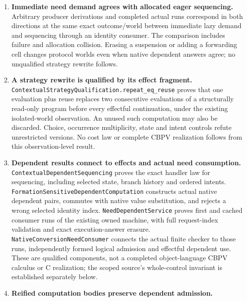 \documentclass[11pt]{article}
\theoremstyle{definition}
\theoremstyle{remark}
\begin{document}
\begin{enumerate}
  dependent index through forcing, and qualified reuse/discard laws hold
  through arbitrary effectful selection and consumers. Independent native
  result-family qualification, typed answer substitution and exact evidence
  erasure connect raw delayed packets to admitted native Sigma results.
  State-change and wrong-index controls separate captured dependency from
  captured mutable state and execution from admission.
\item \textbf{Immediate need demand agrees with allocated eager sequencing.}
  Arbitrary producer derivations and completed actual runs correspond in
  both directions at the same exact outcome/world between immediate lazy
  demand and sequencing through an identity consumer. The comparison
  includes failure and allocation collision. Erasing a suspension or adding
  a forwarding cell changes protocol worlds even when native dependent
  answers agree; no unqualified strategy rewrite follows.
\item \textbf{A strategy rewrite is qualified by its effect fragment.}
  \nolinkurl{ContextualStrategyQualification.repeat_eq_reuse} proves that
  one evaluation plus reuse replaces two consecutive evaluations of a
  structurally read-only program before every effectful continuation, under
  the existing isolated-world observation. An unused such computation may
  also be discarded. Choice, occurrence multiplicity, state and intent
  controls refute unrestricted versions. No cost law or complete CBPV
  realization follows from this observation-level result.
\item \textbf{Dependent results connect to effects and actual need consumption.}
  \nolinkurl{ContextualDependentSequencing} proves the exact handler law for
  sequencing, including selected state, branch history and ordered intents.
  \nolinkurl{FormationSensitiveDependentComputation} constructs actual native
  dependent pairs, commutes with native value substitution, and rejects a
  wrong selected identity index. \nolinkurl{NeedDependentService} proves
  first and cached consumer runs of the existing owned machine, with full
  request-index validation and exact execution-answer erasure.
  \nolinkurl{NativeConversionNeedConsumer} connects the actual finite checker
  to those runs, independently formed logical admission and effectful
  dependent use. These are qualified components, not a completed
  object-language CBPV calculus or C realization; the scoped source's
  whole-control invariant is established separately below.
\item \textbf{Reified computation bodies preserve dependent admission.}

\end{enumerate}
\end{document}
